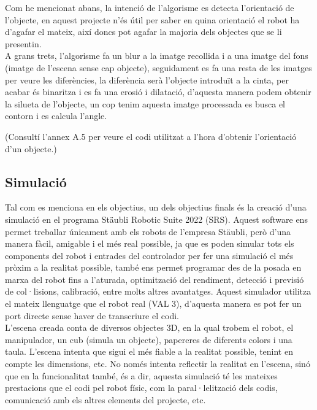 ﻿\documentclass[10pt,a4paper,twocolumn,twoside]{article}
\begin{document}
Com he mencionat abans, la intenció de l'algorisme es detecta l'orientació de l'objecte, en aquest projecte n'és útil per saber en quina orientació el robot ha d'agafar el mateix, així doncs pot agafar la majoria dels objectes que se li presentin.
\\

A grans trets, l'algorisme fa un blur a la imatge recollida i a una imatge del fons (imatge de l'escena sense cap objecte), seguidament es fa una resta de les imatges per veure les diferències, la diferència serà l'objecte introduït a la cinta, per acabar és binaritza i es fa una erosió i dilatació, d'aquesta manera podem obtenir la silueta de l'objecte, un cop tenim aquesta imatge processada es busca el contorn i es calcula l'angle.
\\
 \hfill \break

(Consultí l’annex A.5 per veure el codi utilitzat a l'hora d'obtenir l'orientació d'un objecte.)

\subsection{Simulació}

Tal com es menciona en els objectius, un dels objectius finals és la creació d'una simulació en el programa Stäubli Robotic Suite 2022 (SRS). Aquest software ens permet treballar únicament amb els robots de l'empresa Stäubli, però d'una manera fàcil, amigable i el més real possible, ja que es poden simular tots els components del robot i entrades del controlador per fer una simulació el més pròxim a la realitat possible, també ens permet programar des de la posada en marxa del robot fins a l'aturada, optimització del rendiment, detecció i previsió de col·lisions, calibració, entre molts altres avantatges. Aquest simulador utilitza el mateix llenguatge que el robot real (VAL 3), d'aquesta manera es pot fer un port directe sense haver de transcriure el codi.
\\

L'escena creada conta de diversos objectes 3D, en la qual trobem el robot, el manipulador, un cub (simula un objecte), papereres de diferents colors i una taula. L'escena intenta que sigui el més fiable a la realitat possible, tenint en compte les dimensions, etc. No només intenta reflectir la realitat en l'escena, sinó que en la funcionalitat també, és a dir, aquesta simulació té les mateixes prestacions que el codi pel robot físic, com la paral·lelització dels codis, comunicació amb els altres elements del projecte, etc.
\end{document}
